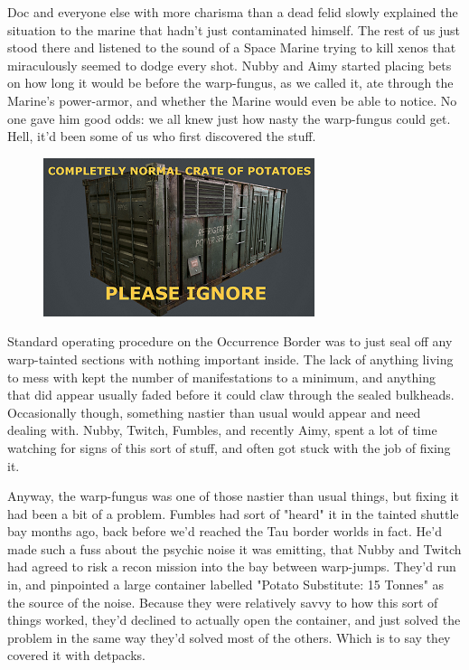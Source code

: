 Doc and everyone else with more charisma than a dead felid slowly explained the situation to the marine that hadn't just contaminated himself. 
The rest of us just stood there and listened to the sound of a Space Marine trying to kill xenos that miraculously seemed to dodge every shot. 
Nubby and Aimy started placing bets on how long it would be before the warp-fungus, as we called it, ate through the Marine's power-armor, and whether the Marine would even be able to notice. 
No one gave him good odds: 
we all knew just how nasty the warp-fungus could get. 
Hell, it'd been some of us who first discovered the stuff.
\begin{figure}
	\begin{center}
		\includegraphics[width=\figwidth]{pics/12/17.png}
	\end{center}
\end{figure}
Standard operating procedure on the Occurrence Border was to just seal off any warp-tainted sections with nothing important inside. 
The lack of anything living to mess with kept the number of manifestations to a minimum, and anything that did appear usually faded before it could claw through the sealed bulkheads. 
Occasionally though, something nastier than usual would appear and need dealing with. 
Nubby, Twitch, Fumbles, and recently Aimy, spent a lot of time watching for signs of this sort of stuff, and often got stuck with the job of fixing it.

Anyway, the warp-fungus was one of those nastier than usual things, but fixing it had been a bit of a problem. 
Fumbles had sort of "heard" it in the tainted shuttle bay months ago, back before we'd reached the Tau border worlds in fact. 
He'd made such a fuss about the psychic noise it was emitting, that Nubby and Twitch had agreed to risk a recon mission into the bay between warp-jumps. 
They'd run in, and pinpointed a large container labelled "Potato Substitute: 
15 Tonnes" as the source of the noise. 
Because they were relatively savvy to how this sort of things worked, they'd declined to actually open the container, and just solved the problem in the same way they'd solved most of the others. 
Which is to say they covered it with detpacks.


